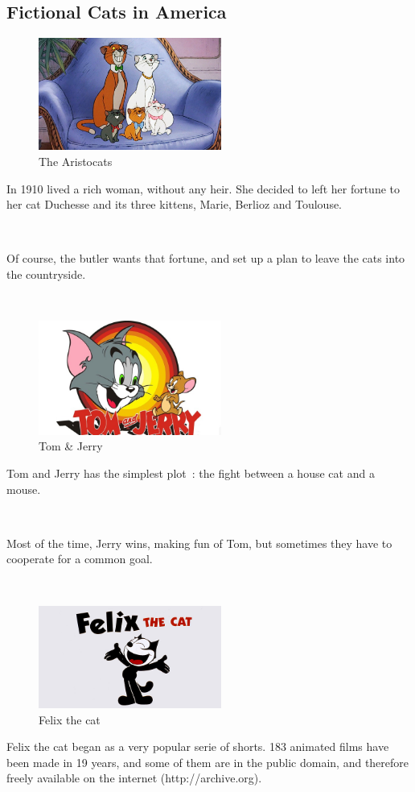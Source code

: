 \documentclass[a0,portrait,20pt]{a0poster}
\begin{document}
\begin{multicols}{2}
\vspace{2.5cm}


\section*{Fictional Cats in America}

\begin{figure}\includegraphics[width=6cm]{aristo.png}\caption{The Aristocats}\end{figure}
In 1910 lived a rich woman, without any heir. She decided to left her fortune to her cat Duchesse and its three kittens, Marie, Berlioz and Toulouse.

~

Of course, the butler wants that fortune, and set up a plan to leave the cats into the countryside.

~

\begin{figure}\includegraphics[width=6cm]{tom.png}\caption{Tom \& Jerry}\end{figure}
Tom and Jerry has the simplest plot : the fight between a house cat and a mouse.

~

Most of the time, Jerry wins, making fun of Tom, but sometimes they have to cooperate for a common goal.

~

\begin{figure}\includegraphics[width=6cm]{felix.png}\caption{Felix the cat}\end{figure}
Felix the cat began as a very popular serie of shorts. 183 animated films have been made in 19 years, and some of them are in the public domain, and therefore freely available on the internet (http://archive.org).


\end{multicols}
\end{document}
